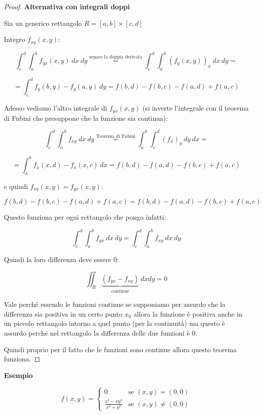 \documentclass[../appunti-analisi.tex]{subfiles}
\begin{document}
\begin{proof} \textbf{Alternativa con integrali doppi} 
    
    Sia un generico rettangolo $R = [a,b]\times [c,d]$

    Integro $f_{xy}(x,y)$:

    \[
        \int_{c}^{d} {\int_{a}^{b} {f_{yx}(x,y)} \: dx } \: d y \overset{\text{separo la doppia derivata}}{=} \int_{c}^{d} {\int_{a}^{b} {(f_y(x,y))_x} \: dx } \: dy=
    \]

    \[
        = \int_{c}^{d} {f_y(b,y) - f_y(a,y)} \: d y = f(b,d) - f(b,c) - f(a,d) + f(a,c)
    \]

    Adesso vediamo l'altro integrale di $f_{yx}(x,y)$ (si inverte l'integrale con il teorema di Fubini che presuppone che la funzione sia continua):

    \[
        \int_{c}^{d} {\int_{a}^{b} {f_{xy}} \: dx } \: d y \overset{\text{Teorema di Fubini}}{=} \int_{a}^{b} {\int_{c}^{d} {(f_x)_y} \: d y } \: dx =
    \]

    \[
        =\int_{a}^{b} {f_x(x,d) - f_x(x,c)} \: dx  = f(b,d) - f(a,d) - f(b,c) + f(a,c)
    \]

    e quindi $f_{xy}(x,y) = f_{yx}(x,y)$:

    \[
      f(b,d) - f(b,c) - f(a,d) + f(a,c) = f(b,d) - f(a,d) - f(b,c) + f(a,c)
    \]

    Questo funziona per ogni rettangolo che pongo infatti:

    \[
        \int_{c}^{d} {\int_{a}^{b} {f_{yx}} \: dx } \: d y =  \int_{c}^{d} {\int_{a}^{b} {f_{xy}} \: dx } \: d y 
    \]

    Quindi la loro differenza deve essere 0:

    \[
        \iint_R \underbrace{{(f_{yx} - f_{xy})}}_\text{continue} \: dx d y = 0
    \]

    Vale perché essendo le funzioni continue se supponiamo per assurdo che la differenza sia positiva in un certo punto $x_0$ allora la funzione è positiva anche in un piccolo rettangolo intorno a quel punto (per la continuità) ma questo è assurdo perché nel rettangolo la differenza delle due funzioni è 0.

    Quindi proprio per il fatto che le funzioni sono continue allora questo teorema funziona.

\end{proof}



\textbf{Esempio} 

\[
f(x,y)=\begin{cases}
    0 & \text{se $(x,y) = (0,0)$} \\
    \frac{x^{3}-xy^{3}}{x^{2}+y^{2}} & \text{se $(x,y) \neq (0,0)$}
\end{cases}
\]
\end{document}
